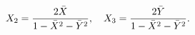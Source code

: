 \begin{equation}
X_2 = {2\bar X \over 1-\bar X^2-\bar Y^2}, \quad X_3 = {2\bar Y
  \over 1-\bar X^2-\bar Y^2}.
\end{equation}

